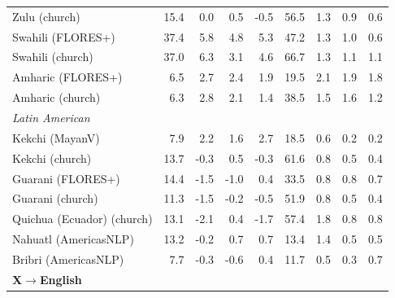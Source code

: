 \begin{table}[htbp]
\begin{tabular}{lrrrrrrrr}
Zulu (church) & 15.4 & 0.0 & \cellcolor{loss!5}0.5 & -0.5 & 56.5 & \cellcolor{loss!13}1.3 & \cellcolor{loss!8}0.9 & \cellcolor{loss!6}0.6 \\
Swahili (FLORES+) & 37.4 & \cellcolor{loss!56}5.8 & \cellcolor{loss!45}4.8 & \cellcolor{loss!51}5.3 & 47.2 & \cellcolor{loss!13}1.3 & \cellcolor{loss!10}1.0 & \cellcolor{loss!6}0.6 \\
Swahili (church) & 37.0 & \cellcolor{loss!60}6.3 & \cellcolor{loss!30}3.1 & \cellcolor{loss!44}4.6 & 66.7 & \cellcolor{loss!12}1.3 & \cellcolor{loss!11}1.1 & \cellcolor{loss!10}1.1 \\
Amharic (FLORES+) & 6.5 & \cellcolor{loss!26}2.7 & \cellcolor{loss!23}2.4 & \cellcolor{loss!18}1.9 & 19.5 & \cellcolor{loss!20}2.1 & \cellcolor{loss!18}1.9 & \cellcolor{loss!17}1.8 \\
Amharic (church) & 6.3 & \cellcolor{loss!27}2.8 & \cellcolor{loss!20}2.1 & \cellcolor{loss!14}1.4 & 38.5 & \cellcolor{loss!14}1.5 & \cellcolor{loss!16}1.6 & \cellcolor{loss!12}1.2 \\
\midrule \multicolumn{9}{l}{\textit{Latin American}} \\
Kekchi (MayanV) & 7.9 & \cellcolor{loss!21}2.2 & \cellcolor{loss!15}1.6 & \cellcolor{loss!26}2.7 & 18.5 & \cellcolor{loss!6}0.6 & \cellcolor{loss!2}0.2 & \cellcolor{loss!2}0.2 \\
Kekchi (church) & 13.7 & -0.3 & \cellcolor{loss!5}0.5 & -0.3 & 61.6 & \cellcolor{loss!7}0.8 & \cellcolor{loss!4}0.5 & \cellcolor{loss!4}0.4 \\
Guarani (FLORES+) & 14.4 & -1.5 & -1.0 & \cellcolor{loss!4}0.4 & 33.5 & \cellcolor{loss!7}0.8 & \cellcolor{loss!7}0.8 & \cellcolor{loss!6}0.7 \\
Guarani (church) & 11.3 & -1.5 & -0.2 & -0.5 & 51.9 & \cellcolor{loss!8}0.8 & \cellcolor{loss!5}0.5 & \cellcolor{loss!4}0.4 \\
Quichua (Ecuador) (church) & 13.1 & -2.1 & \cellcolor{loss!4}0.4 & -1.7 & 57.4 & \cellcolor{loss!17}1.8 & \cellcolor{loss!8}0.8 & \cellcolor{loss!8}0.8 \\
Nahuatl (AmericasNLP) & 13.2 & -0.2 & \cellcolor{loss!7}0.7 & \cellcolor{loss!7}0.7 & 13.4 & \cellcolor{loss!14}1.4 & \cellcolor{loss!5}0.5 & \cellcolor{loss!5}0.5 \\
Bribri (AmericasNLP) & 7.7 & -0.3 & -0.6 & \cellcolor{loss!4}0.4 & 11.7 & \cellcolor{loss!5}0.5 & \cellcolor{loss!3}0.3 & \cellcolor{loss!7}0.7 \\
\midrule \multicolumn{9}{l}{\textbf{X$\rightarrow$English}} \\ \midrule

\end{tabular}
\end{table}
